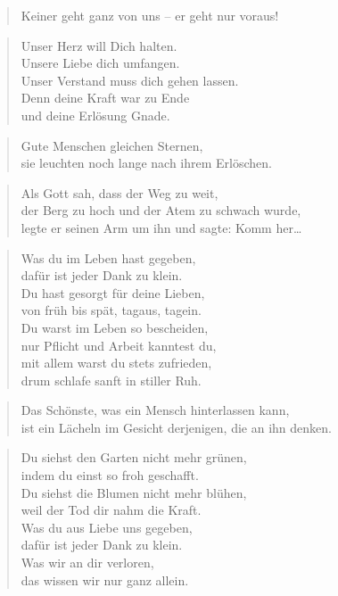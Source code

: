 \documentclass[ngerman,a4paper,11pt]{scrreprt}
\begin{document}
\begin{verse}
Keiner geht ganz von uns -- er geht nur voraus! \\
\end{verse}

\begin{verse}
Unser Herz will Dich halten. \\
Unsere Liebe dich umfangen. \\
Unser Verstand muss dich gehen lassen. \\
Denn deine Kraft war zu Ende \\
und deine Erlösung Gnade. \\
\end{verse}

\begin{verse}
Gute Menschen gleichen Sternen, \\
sie leuchten noch lange nach ihrem Erlöschen. \\
\end{verse}

\begin{verse}
Als Gott sah, dass der Weg zu weit, \\
der Berg zu hoch und der Atem zu schwach wurde, \\
legte er seinen Arm um ihn und sagte: Komm her\ldots{} \\
\end{verse}

\begin{verse}
Was du im Leben hast gegeben, \\
dafür ist jeder Dank zu klein. \\
Du hast gesorgt für deine Lieben, \\
von früh bis spät, tagaus, tagein. \\
Du warst im Leben so bescheiden, \\
nur Pflicht und Arbeit kanntest du, \\
mit allem warst du stets zufrieden, \\
drum schlafe sanft in stiller Ruh. \\
\end{verse}

\begin{verse}
Das Schönste, was ein Mensch hinterlassen kann, \\
ist ein Lächeln im Gesicht derjenigen, die an ihn denken. \\
\end{verse}

\begin{verse}
Du siehst den Garten nicht mehr grünen, \\
indem du einst so froh geschafft. \\
Du siehst die Blumen nicht mehr blühen, \\
weil der Tod dir nahm die Kraft. \\
Was du aus Liebe uns gegeben, \\
dafür ist jeder Dank zu klein. \\
Was wir an dir verloren, \\
das wissen wir nur ganz allein. \\
\end{verse}
\end{document}
